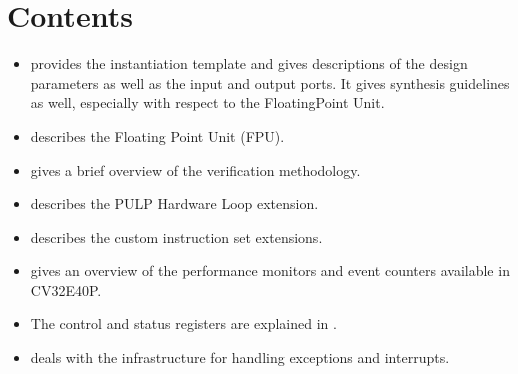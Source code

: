 \documentclass[letterpaper,10pt,english]{sphinxmanual}
\begin{document}
\section{Contents}
\label{\detokenize{intro:contents}}\begin{itemize}
\item {} 
\sphinxAtStartPar
{\hyperref[\detokenize{integration:core-integration}]{}} provides the instantiation template and gives descriptions of the design parameters as well as the input and output ports. It gives synthesis guidelines as well, especially with respect to the Floating\sphinxhyphen{}Point Unit.

\item {} 
\sphinxAtStartPar
{\hyperref[\detokenize{fpu:fpu}]{}} describes the Floating Point Unit (FPU).

\item {} 
\sphinxAtStartPar
{\hyperref[\detokenize{verification:verification}]{}} gives a brief overview of the verification methodology.

\item {} 
\sphinxAtStartPar
{\hyperref[\detokenize{corev_hw_loop:hwloop-specs}]{}} describes the PULP Hardware Loop extension.

\item {} 
\sphinxAtStartPar
{\hyperref[\detokenize{instruction_set_extensions:custom-isa-extensions}]{}} describes the custom instruction set extensions.

\item {} 
\sphinxAtStartPar
{\hyperref[\detokenize{perf_counters:performance-counters}]{}} gives an overview of the performance monitors and event counters available in CV32E40P.

\item {} 
\sphinxAtStartPar
The control and status registers are explained in {\hyperref[\detokenize{control_status_registers:cs-registers}]{}}.

\item {} 
\sphinxAtStartPar
{\hyperref[\detokenize{exceptions_interrupts:exceptions-interrupts}]{}} deals with the infrastructure for handling exceptions and interrupts.


\end{itemize}
\end{document}
